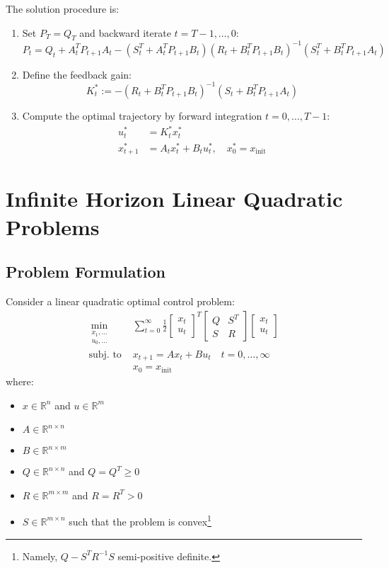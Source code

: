 \documentclass[openany]{book}
\theoremstyle{definition}
\theoremstyle{remark}
\begin{document}
The solution procedure is:

\begin{enumerate}
\item Set $P_T = Q_T$ and backward iterate $t = T-1,\dots,0$:
\[
P_t = Q_t + A_t^T P_{t+1} A_t - (S_t^T + A_t^T P_{t+1} B_t)(R_t + B_t^T P_{t+1} B_t)^{-1}(S_t^T + B_t^T P_{t+1} A_t)
\]

\item Define the feedback gain:
\[
K_t^* := -(R_t + B_t^T P_{t+1} B_t)^{-1}(S_t + B_t^T P_{t+1} A_t)
\]

\item Compute the optimal trajectory by forward integration $t = 0,\dots,T-1$:
\begin{align*}
u_t^* &= K_t^*x_t^*\\
x_{t+1}^* &= A_tx_t^* + B_tu_t^*, \quad x_0^* = x_{\text{init}}
\end{align*}
\end{enumerate}

\section{Infinite Horizon Linear Quadratic Problems}

\subsection{Problem Formulation}
Consider a linear quadratic optimal control problem:
\begin{align*}
\min_{\substack{x_1,\dots \\ u_0,\dots}} &\sum_{t=0}^{\infty} \frac{1}{2}\begin{bmatrix}
x_t \\ u_t
\end{bmatrix}^T \begin{bmatrix}
Q & S^T \\ S & R
\end{bmatrix} \begin{bmatrix}
x_t \\ u_t
\end{bmatrix}\\
\text{subj. to } & x_{t+1} = Ax_t + Bu_t \quad t=0,\dots,\infty\\
&x_0 = x_{\text{init}}
\end{align*}
where:
\begin{itemize}
\item $x \in \mathbb{R}^n$ and $u \in \mathbb{R}^m$
\item $A \in \mathbb{R}^{n\times n}$
\item $B \in \mathbb{R}^{n\times m}$
\item $Q \in \mathbb{R}^{n\times n}$ and $Q = Q^T \geq 0$  
\item $R \in \mathbb{R}^{m\times m}$ and $R = R^T > 0$
\item $S \in \mathbb{R}^{m\times n}$ such that the problem is convex\footnote{Namely, $Q - S^T R^{-1} S$ semi-positive definite.}
\end{itemize}
\end{document}
